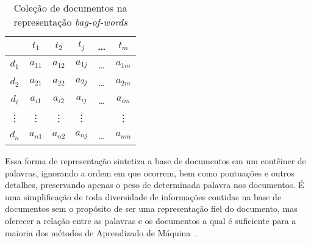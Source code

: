 \begin{table}[!h]
	\centering

	\begin{tabular}{|c|ccccc|}

	\hline
	    & $t_1$      & $t_2$     & $t_j$    & \dots & $t_m$      \\ \hline \hline
	$d_1$ & $a_{11}$ & $a_{12}$  & $a_{1j}$ & \dots & $a_{1m}$   \\  %
	$d_2$ & $a_{21}$ & $a_{22}$  & $a_{2j}$ & \dots & $a_{2m}$   \\  %
	$d_i$ & $a_{i1}$ & $a_{i2}$  & $a_{ij}$ & \dots & $a_{im}$   \\  %
	\vdots & \vdots    & \vdots     & \vdots    & \ddots & \vdots      \\  %
	$d_n$ & $a_{n1}$ & $a_{n2}$  & $a_{nj}$ & \dots & $a_{nm}$   \\  \hline 

	\end{tabular}

	\caption{Coleção de documentos na representação \textit{bag-of-words}}
	\label{table:bagofwords} 
\end{table}


Essa forma de representação sintetiza a base de documentos em um contêiner de palavras, ignorando a ordem em que ocorrem, bem como pontuações e outros detalhes, preservando apenas o peso de determinada palavra nos documentos. É uma simplificação de toda diversidade de informações contidas na base de documentos sem o propósito de ser uma representação fiel do documento, mas oferecer a relação entre as palavras e os documentos a qual é suficiente para a maioria dos métodos de Aprendizado de Máquina~\cite{Aggarwal2018, Feldman2006, Rezende2003}. 







